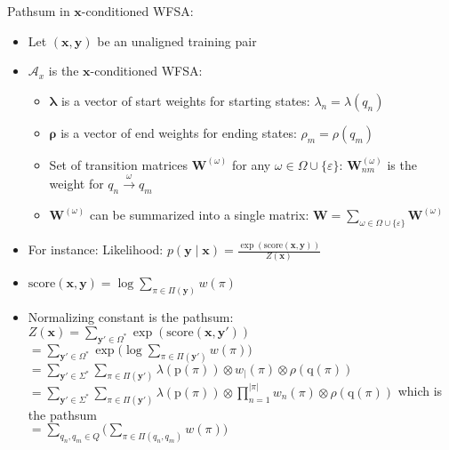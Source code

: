 Pathsum in $\boldsymbol{x}$-conditioned WFSA:    \begin{itemize}
    \item Let $(\boldsymbol{x}, \boldsymbol{y})$ be an unaligned training pair
    \item $\mathcal{A}_x$ is the $\boldsymbol{x}$-conditioned WFSA:
    \begin{itemize}
        \item $\boldsymbol{\lambda}$ is a vector of start weights for starting states: $\lambda_n = \lambda(q_n)$
        \item $\boldsymbol{\rho}$ is a vector of end weights for ending states: $\rho_m = \rho(q_m)$
        \item Set of transition matrices $\boldsymbol{W}^{(\omega)}$ for any $\omega \in \Omega \cup \{\varepsilon\}$:
        $
        \boldsymbol{W}_{nm}^{(\omega)}$ is the weight for $q_n \xrightarrow{\omega} q_m
        $
        \item $\boldsymbol{W}^{(\omega)}$ can be summarized into a single matrix:
        $
        \boldsymbol{W} = \sum_{\omega \in \Omega \cup \{\varepsilon\}} \boldsymbol{W}^{(\omega)}
        $
    \end{itemize}
    \item For instance: Likelihood:
    $
    p(\boldsymbol{y} \mid \boldsymbol{x}) = \frac{\exp(\textrm{score}(\boldsymbol{x}, \boldsymbol{y}))}{Z(\boldsymbol{x})}
    $ 
    \item
    $
    \textrm{score}(\boldsymbol{x}, \boldsymbol{y}) = \log \sum_{\pi \in \Pi(\boldsymbol{y})} w(\pi)
    $
    \item Normalizing constant is the pathsum:
    $
    Z(\boldsymbol{x}) = \sum_{\boldsymbol{y}' \in \Omega^*} \exp(\textrm{score}(\boldsymbol{x}, \boldsymbol{y}'))
    $\\
    $
    = \sum_{\boldsymbol{y}' \in \Omega^*} \exp \Big( \log \sum_{\pi \in \Pi(\boldsymbol{y}')} w(\pi) \Big)
    $\\
    $
    = \sum_{\boldsymbol{y}' \in \Sigma^*} \sum_{\pi \in \Pi(\boldsymbol{y}')} \lambda(\textrm{p}(\pi)) \otimes w_\mid(\pi) \otimes \rho(\textrm{q}(\pi))
    $\\
    $
    = \sum_{\boldsymbol{y}' \in \Sigma^*} \sum_{\pi \in \Pi(\boldsymbol{y}')} \lambda(\textrm{p}(\pi)) \otimes \prod_{n=1}^{| \pi |} w_n(\pi) \otimes \rho(\textrm{q}(\pi))
    $ which is the pathsum\\
    $
    = \sum_{q_n, q_m \in Q} \Big( \sum_{\pi \in \Pi(q_n, q_m)} w(\pi) \Big)
    $\\

\end{itemize}
